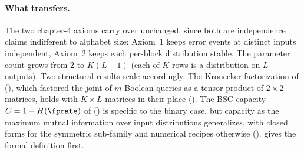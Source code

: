 \paragraph{What transfers.}
The two chapter-4 axioms carry over unchanged, since both are independence
claims indifferent to alphabet size: Axiom~1 keeps error events at distinct
inputs independent, Axiom~2 keeps each per-block distribution stable. The
parameter count grows from $2$ to $K(L-1)$ (each of $K$ rows is a distribution
on $L$ outputs). Two structural results scale accordingly. The Kronecker
factorization of  (), which factored
the joint of $m$ Boolean queries as a tensor product of $2 \times 2$ matrices,
holds with $K \times L$ matrices in their place ().
The BSC capacity $C = 1 - H(\fprate)$ of 
() is specific to the binary case, but capacity as the
maximum mutual information over input distributions generalizes, with closed
forms for the symmetric sub-family and numerical recipes otherwise
().  gives the formal
definition first.
